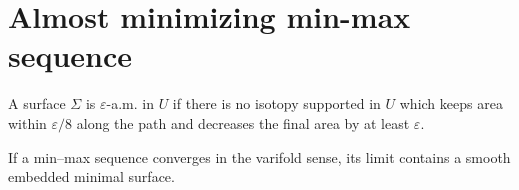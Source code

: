 \chapter{Almost minimizing min-max sequence}

\begin{definition}\label{def:am}
A surface $\Sigma$ is $\varepsilon$-a.m. in $U$ if there is no isotopy supported in $U$ which keeps area within $\varepsilon/8$ along the path and decreases the final area by at least $\varepsilon$. \uses{}
\end{definition}

\begin{lemma}\label{lem:conv-reg}
If a min--max sequence converges in the varifold sense, its limit contains a smooth embedded minimal surface. 
\end{lemma}
